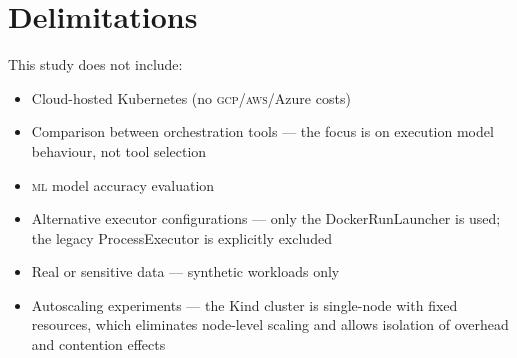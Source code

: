\section{Delimitations}

This study does not include:

\begin{itemize}
  \item Cloud-hosted Kubernetes (no \textsc{gcp}/\textsc{aws}/Azure costs)
  \item Comparison between orchestration tools --- the focus is on execution model
        behaviour, not tool selection
  \item \textsc{ml} model accuracy evaluation
  \item Alternative \vm{} executor configurations --- only the DockerRunLauncher is used;
        the legacy ProcessExecutor is explicitly excluded
  \item Real or sensitive data --- synthetic workloads only
  \item Autoscaling experiments --- the Kind cluster is single-node with fixed resources,
        which eliminates node-level scaling and allows isolation of overhead and contention
        effects
\end{itemize}
